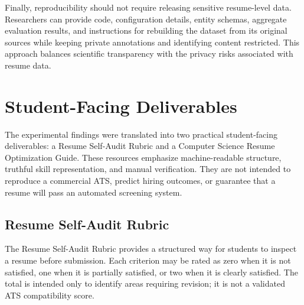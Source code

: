 \documentclass[conference]{IEEEtran}
\begin{document}
Finally, reproducibility should not require releasing sensitive
resume-level data. Researchers can provide code, configuration details,
entity schemas, aggregate evaluation results, and instructions for
rebuilding the dataset from its original sources while keeping private
annotations and identifying content restricted. This approach balances
scientific transparency with the privacy risks associated with resume
data.

\section{Student-Facing Deliverables}

The experimental findings were translated into two practical
student-facing deliverables: a Resume Self-Audit Rubric and a Computer
Science Resume Optimization Guide. These resources emphasize
machine-readable structure, truthful skill representation, and manual
verification. They are not intended to reproduce a commercial ATS,
predict hiring outcomes, or guarantee that a resume will pass an
automated screening system.

\subsection{Resume Self-Audit Rubric}

The Resume Self-Audit Rubric provides a structured way for students to
inspect a resume before submission. Each criterion may be rated as zero
when it is not satisfied, one when it is partially satisfied, or two when
it is clearly satisfied. The total is intended only to identify areas
requiring revision; it is not a validated ATS compatibility score.
\end{document}
